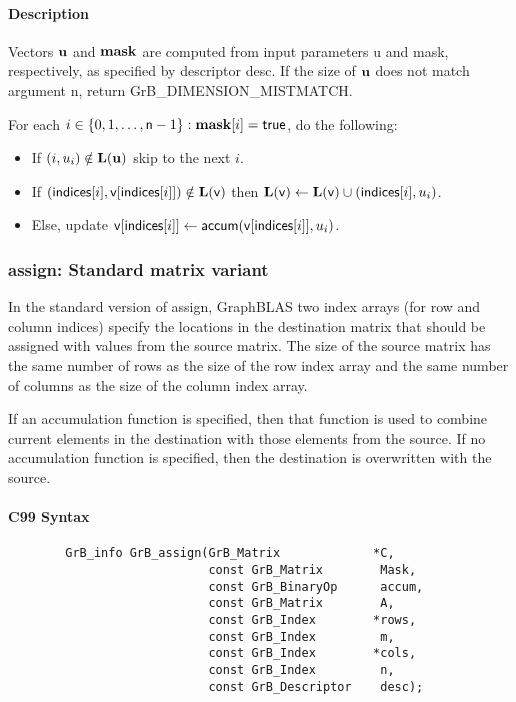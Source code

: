 \paragraph{Description}

Vectors ${\bf u}$ and ${\bf mask}$ are computed from input parameters {\sf u} and {\sf mask}, respectively, as specified by descriptor {\sf desc}. If
the size of ${\bf u}$ does not match argument {\sf n}, return {\sf GrB\_DIMENSION\_MISTMATCH}.

For each $i \in \{0, 1, \ldots, {\sf n}-1 \} : {\bf mask}[i] = {\sf true}$, do the following:
\begin{itemize}
	\item[] If $(i, u_i) \notin \bold{L}({\bf u})$ skip to the next $i$.
	\item[] If $({\sf indices}[i], {\sf v}[{\sf indices}[i]]) \notin \bold{L}({\sf v})$ then
	      $\bold{L}({\sf v}) \leftarrow \bold{L}({\sf v}) \cup ({\sf indices}[i],u_i)$.
	\item[] Else, update ${\sf v}[{\sf indices}[i]] \leftarrow {\sf accum}({\sf v}[{\sf indices}[i]],u_i)$.
\end{itemize}


\subsubsection{{\sf assign}: Standard matrix variant}

In the standard version of {\sf assign}, GraphBLAS two index arrays (for row and
column indices) specify the locations in the destination matrix that should be 
assigned with values from the source matrix.  The size of the source matrix has the same
number of rows as the size of the row index array and the same number
of columns as the size of the column index array.

If an accumulation function is specified, then that function is used
to combine current elements in the destination with those elements
from the source.  If no accumulation function is specified, then the
destination is overwritten with the source.

\paragraph{C99 Syntax}

\begin{verbatim}
        GrB_info GrB_assign(GrB_Matrix             *C,
                            const GrB_Matrix        Mask,
                            const GrB_BinaryOp      accum,
                            const GrB_Matrix        A,
                            const GrB_Index        *rows,
                            const GrB_Index         m,
                            const GrB_Index        *cols,
                            const GrB_Index         n,
                            const GrB_Descriptor    desc);
\end{verbatim}

